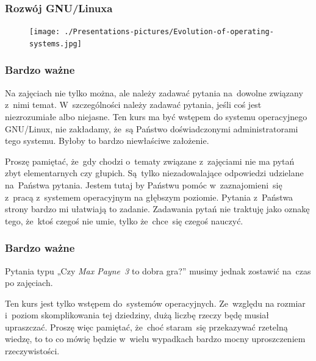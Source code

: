 \documentclass[10pt,t]{beamer}
\begin{document}
\begin{frame}
  \frametitle{Rozwój GNU/Linuxa}

  \vspace{-0.5em}


  \begin{figure}

    \label{fig:Evolution-of-OS}

    \centering


    \texttt{[image: ./Presentations-pictures/Evolution-of-operating-systems.jpg]}

  \end{figure}

\end{frame}





\begin{frame}
  \frametitle{Bardzo ważne}


  Na zajęciach nie tylko można, ale \alert{należy} zadawać pytania
  na~dowolne związany z~nimi temat. W~szczególności \alert{należy} zadawać
  pytania, jeśli coś jest niezrozumiałe albo niejasne. Ten kurs ma być
  wstępem do systemu operacyjnego GNU/Linux, \alert{nie} zakładamy, że~są
  Państwo doświadczonymi administratorami tego systemu. Byłoby to bardzo
  niewłaściwe założenie.

  Proszę pamiętać, że~gdy chodzi o~tematy związane z~zajęciami \alert{nie}
  ma pytań zbyt elementarnych czy głupich. Są~tylko niezadowalające
  odpowiedzi udzielane na~Państwa pytania. Jestem tutaj by Państwu pomóc
  w~zaznajomieni~się z~pracą z~systemem operacyjnym na głębszym poziomie.
  Pytania z~Państwa strony bardzo mi ułatwiają to zadanie. Zadawania pytań
  nie traktuję jako oznakę tego, że~ktoś czegoś nie umie, tylko że~chce~się
  czegoś nauczyć.

\end{frame}





\begin{frame}
  \frametitle{Bardzo ważne}


  Pytania typu „Czy \textit{Max Payne~3} to dobra gra?” musimy jednak
  zostawić na~czas po zajęciach.

  Ten kurs jest tylko \alert{wstępem} do~systemów operacyjnych. Ze~względu
  na rozmiar i~poziom skomplikowania tej dziedziny, dużą liczbę rzeczy
  będę musiał \alert{upraszczać}. Proszę więc pamiętać, że~choć staram~się
  przekazywać rzetelną wiedzę, to to co mówię będzie w~wielu wypadkach
  bardzo mocny uproszczeniem rzeczywistości.

\end{frame}
\end{document}
